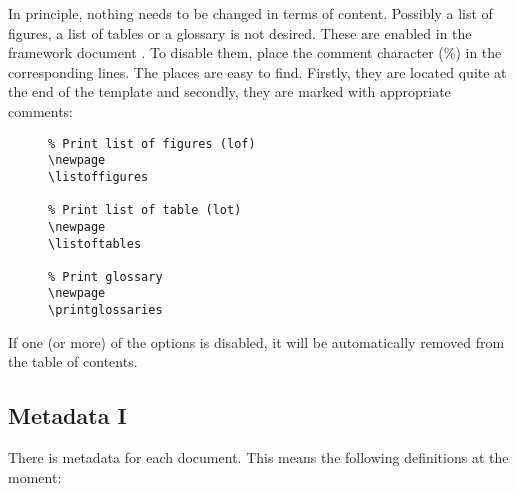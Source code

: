 In principle, nothing needs to be changed in terms of content. Possibly a
list of figures, a list of tables or a glossary is not desired. These are
enabled in the framework document . To disable
them, place the comment character (\%) in the corresponding lines. The places
are easy to find. Firstly, they are located quite at the end of the template
and secondly, they are marked with appropriate comments:

\begin{figure}[H]
    \scriptsize
    \centering
    \begin{BVerbatim}
\newpage
\listoffigures

\newpage
\listoftables

\newpage
\printglossaries
    \end{BVerbatim}
\end{figure}

If one (or more) of the options is disabled, it will be automatically removed
from the table of contents.

\subsection{Metadata I}
\label{subsec:Metadata-I}

There is metadata for each document. This means the following definitions at
the moment:

